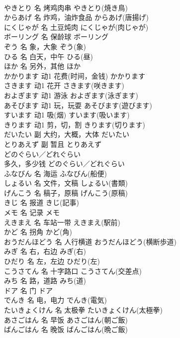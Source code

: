 \documentclass[8pt]{extreport}
\begin{document}
\begin{CJK}{UTF8}{min}
\\	やきとり	名	烤鸡肉串	やきとり(焼き鳥)	
\\	からあげ	名	炸鸡，油炸食品	からあげ(唐揚げ)	
\\	にくじゃが	名	土豆炖肉	にくじゃが(肉じゃが)	
\\	ボーリング	名	保龄球	ボーリング	
\\	ぞう	名	象，大象	ぞう(象)	
\\	ひる	名	白天，中午	ひる(昼)	
\\	ほか	名	另外，其他	ほか	
\\	かかります	动1	花费(时间，金钱)	かかります	
\\	さきます	动1	花开	さきます(咲きます)	
\\	およぎます	动1	游泳	およぎます(泳ぎます)	
\\	あそびます	动1	玩，玩耍	あそびます(遊びます)	
\\	すいます	动1	吸(烟)	すいます(吸います)	
\\	きります	动1	剪，切，割	きります(切ります)	
\\	だいたい	副	大约，大概，大体	だいたい	
\\	とりあえず	副	暂且	とりあえず	
\\	どのぐらい／どれぐらい	
\\	多久，多少钱	どのぐらい／どれぐらい	
\\	ふなびん	名	海运	ふなびん(船便)	
\\	しょるい	名	文件，文稿	しょるい(書類)	
\\	げんこう	名	稿子，原稿	げんこう(原稿)	
\\	きじ	名	报道	きじ(記事)	
\\	メモ	名	记录	メモ	
\\	えきまえ	名	车站一带	えきまえ(駅前)	
\\	かど	名	拐角	かど(角)	
\\	おうだんほどう	名	人行横道	おうだんほどう(横断歩道)	
\\	みぎ	名	右，右边	みぎ(右)	
\\	ひだり	名	左，左边	ひだり(左)	
\\	こうさてん	名	十字路口	こうさてん(交差点)	
\\	みち	名	路，道路	みち(道)	
\\	ドア	名	门	ドア	
\\	でんき	名	电，电力	でんき(電気)	
\\	たいきょくけん	名	太极拳	たいきょくけん(太極拳)	
\\	あさごはん	名	早饭	あさごはん(朝ご飯)	
\\	ばんごはん	名	晚饭	ばんごはん(晩ご飯)	

\end{CJK}
\end{document}
